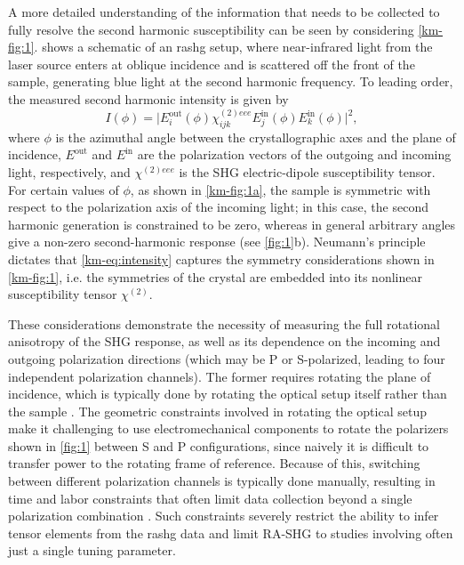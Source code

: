 A more detailed understanding of the information that needs to be collected to fully resolve the second harmonic susceptibility can be seen by considering \cref{km-fig:1}.
 shows a schematic of an \gls{rashg} setup, where near-infrared light from the laser source enters at oblique incidence and is scattered off the front of the sample, generating blue light at the second harmonic frequency.
To leading order, the measured second harmonic intensity is given by
\begin{equation}
I(\phi) = \big| E^{\mathrm{out}}_i(\phi) \chi^{(2)eee}_{ijk} E^{\mathrm{in}}_j(\phi) E^{\mathrm{in}}_k(\phi)\big|^2,
    \label{km-eq:intensity}
\end{equation}
where $\phi$ is the azimuthal angle between the crystallographic axes and the plane of incidence, $E^{\mathrm{out}}$ and $E^{\mathrm{in}}$ are the polarization vectors of the outgoing and incoming light, respectively, and $\chi^{(2)eee}$ is the SHG electric-dipole susceptibility tensor.
For certain values of $\phi$, as shown in \cref{km-fig:1a}, the sample is symmetric with respect to the polarization axis of the incoming light; in this case, the second harmonic generation is constrained to be zero, whereas in general arbitrary angles give a non-zero second-harmonic response (see \cref{fig:1}b).
Neumann's principle dictates that \cref{km-eq:intensity} captures the symmetry considerations shown in \cref{km-fig:1}, i.e. the symmetries of the crystal are embedded into its nonlinear susceptibility tensor $\chi^{(2)}$.

These considerations demonstrate the necessity of measuring the full rotational anisotropy of the SHG response, as well as its dependence on the incoming and outgoing polarization directions (which may be P or S-polarized, leading to four independent polarization channels).
The former requires rotating the plane of incidence, which is typically done by rotating the optical setup itself rather than the sample \citep{petersen_nonlinear_2006,torchinsky_low_2014, fichera_second_2020, camn2bi2}. 
The geometric constraints involved in rotating the optical setup make it challenging to use electromechanical components to rotate the polarizers shown in \cref{fig:1} between S and P configurations, since naively it is difficult to transfer power to the rotating frame of reference.
Because of this, switching between different polarization channels is typically done manually, resulting in time and labor constraints that often limit data collection beyond a single polarization combination \citep{shan_gian_2021}.
Such constraints severely restrict the ability to infer tensor elements from the \gls{rashg} data and limit RA-SHG to studies involving often just a single tuning parameter. 

